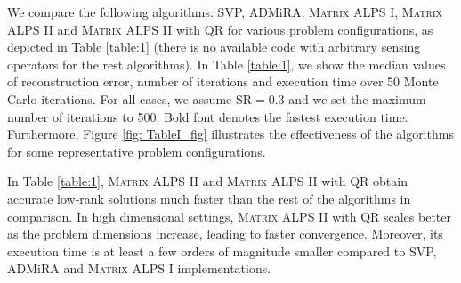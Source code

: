 \documentclass[twocolumn]{svjour3}
\begin{document}
We compare the following algorithms: SVP, ADMiRA, \textsc{Matrix ALPS I}, \textsc{Matrix ALPS II} and \textsc{Matrix ALPS II} with QR for various problem configurations, as depicted in Table \ref{table:1} (there is no available code with arbitrary sensing operators for the rest algorithms). In Table \ref{table:1}, we show the median values of reconstruction error, number of iterations and execution time over 50 Monte Carlo iterations. For all cases, we assume $\text{SR} = 0.3 $ and we set the maximum number of iterations to 500. Bold font denotes the fastest execution time. Furthermore, Figure \ref{fig: TableI_fig} illustrates the effectiveness of the algorithms for some representative problem configurations.

In Table \ref{table:1}, \textsc{Matrix ALPS II} and \textsc{Matrix ALPS II} with QR obtain accurate low-rank solutions much faster than the rest of the algorithms in comparison. In high dimensional settings, \textsc{Matrix ALPS II} with QR scales better as the problem dimensions increase, leading to faster convergence. Moreover, its execution time is at least a few orders of magnitude smaller compared to SVP, ADMiRA and \textsc{Matrix ALPS I} implementations.
\end{document}
